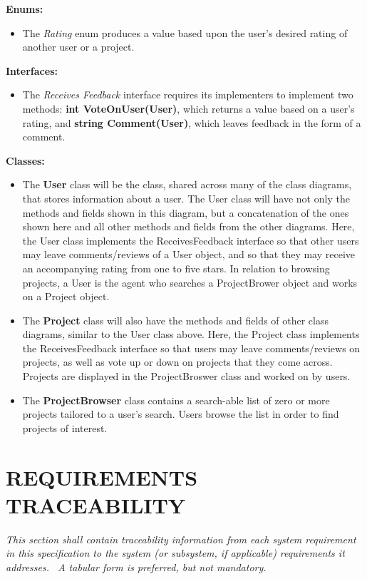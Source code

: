 \documentclass[twoside,letterpaper]{article}
\begin{document}
{\textbf{Enums:}\\
\begin{itemize}
	\item The \textit{Rating} enum produces a value based upon the user's desired rating of another user or a project.
\end{itemize}
\textbf{Interfaces:}\\
\begin{itemize}
	\item The \textit{Receives Feedback} interface requires its implementers to implement two methods: \textbf{int VoteOnUser(User)}, which returns a value based on a user's rating, and \textbf{string Comment(User)}, which leaves feedback in the form of a comment.
\end{itemize}
\textbf{Classes:}
\begin{itemize}
	\item The \textbf{User} class will be the class, shared across many of the class diagrams, that stores information about a user. The User class will have not only the methods and fields shown in this diagram, but a concatenation of the ones shown here and all other methods and fields from the other diagrams. Here, the User class implements the ReceivesFeedback interface so that other users may leave comments/reviews of a User object, and so that they may receive an accompanying rating from one to five stars. In relation to browsing projects, a User is the agent who searches a ProjectBrower object and works on a Project object.
	\item The \textbf{Project} class will also have the methods and fields of other class diagrams, similar to the User class above. Here, the Project class implements the ReceivesFeedback interface so that users may leave comments/reviews on projects, as well as vote up or down on projects that they come across. Projects are displayed in the ProjectBroswer class and worked on by users.
	\item The \textbf{ProjectBrowser} class contains a search-able list of zero or more projects tailored to a user's search. Users browse the list in order to find projects of interest. 
\end{itemize}

\subparagraph[]{\rmfamily\color{black} }
\clearpage\setcounter{page}{1}\pagestyle{Convertvi}
\section[REQUIREMENTS TRACEABILITY]{\rmfamily\bfseries\color{black} REQUIREMENTS TRACEABILITY}
\hypertarget{RefHeading28459017292}{}{\itshape\color{black}
This section shall contain traceability information from each system requirement in this specification to the system (or
subsystem, if applicable) requirements it addresses. \ A tabular form is preferred, but not mandatory.}


}
\end{document}
